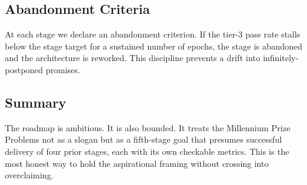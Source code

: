 \subsection{Abandonment Criteria}
At each stage we declare an abandonment criterion. If the tier-3 pass rate stalls below the stage target for a sustained number of epochs, the stage is abandoned and the architecture is reworked. This discipline prevents a drift into infinitely-postponed promises.

\subsection{Summary}
The roadmap is ambitious. It is also bounded. It treats the Millennium Prize Problems not as a slogan but as a fifth-stage goal that presumes successful delivery of four prior stages, each with its own checkable metrics. This is the most honest way to hold the aspirational framing without crossing into overclaiming.
